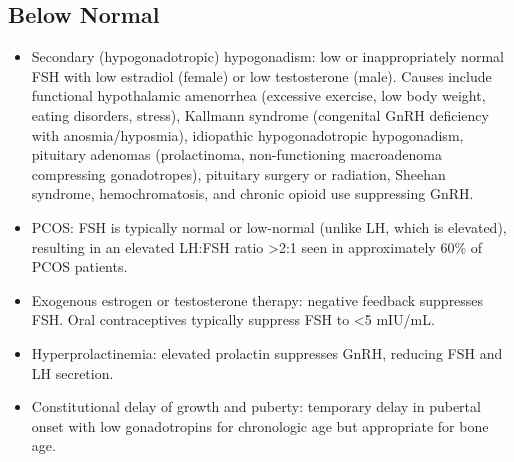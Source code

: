 \subsection*{Below Normal}
\begin{itemize}
  \item Secondary (hypogonadotropic) hypogonadism: low or inappropriately normal FSH with low estradiol (female) or low testosterone (male). Causes include functional hypothalamic amenorrhea (excessive exercise, low body weight, eating disorders, stress), Kallmann syndrome (congenital GnRH deficiency with anosmia/hyposmia), idiopathic hypogonadotropic hypogonadism, pituitary adenomas (prolactinoma, non-functioning macroadenoma compressing gonadotropes), pituitary surgery or radiation, Sheehan syndrome, hemochromatosis, and chronic opioid use suppressing GnRH.
  \item PCOS: FSH is typically normal or low-normal (unlike LH, which is elevated), resulting in an elevated LH:FSH ratio >2:1 seen in approximately 60\% of PCOS patients.
  \item Exogenous estrogen or testosterone therapy: negative feedback suppresses FSH. Oral contraceptives typically suppress FSH to <5 mIU/mL.
  \item Hyperprolactinemia: elevated prolactin suppresses GnRH, reducing FSH and LH secretion.
  \item Constitutional delay of growth and puberty: temporary delay in pubertal onset with low gonadotropins for chronologic age but appropriate for bone age.
\end{itemize}

